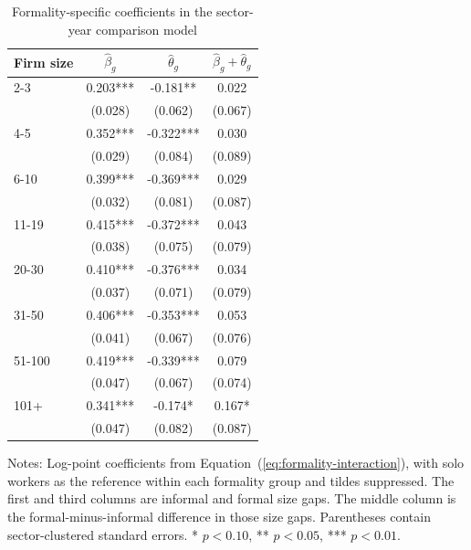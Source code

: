 \begin{table}[htbp]
  \centering
  \caption{Formality-specific coefficients in the sector-year comparison model}
  \label{tab:formality-interaction-coefficients}
  \small
  \begin{tabular}{lccc}
    \toprule
    Firm size & $\hat{\beta}_g$ & $\hat{\theta}_g$ & $\hat{\beta}_g+\hat{\theta}_g$ \\
    \midrule
    2-3 & 0.203*** & -0.181** & 0.022 \\
     & (0.028) & (0.062) & (0.067) \\
    4-5 & 0.352*** & -0.322*** & 0.030 \\
     & (0.029) & (0.084) & (0.089) \\
    6-10 & 0.399*** & -0.369*** & 0.029 \\
     & (0.032) & (0.081) & (0.087) \\
    11-19 & 0.415*** & -0.372*** & 0.043 \\
     & (0.038) & (0.075) & (0.079) \\
    20-30 & 0.410*** & -0.376*** & 0.034 \\
     & (0.037) & (0.071) & (0.079) \\
    31-50 & 0.406*** & -0.353*** & 0.053 \\
     & (0.041) & (0.067) & (0.076) \\
    51-100 & 0.419*** & -0.339*** & 0.079 \\
     & (0.047) & (0.067) & (0.074) \\
    101+ & 0.341*** & -0.174* & 0.167* \\
     & (0.047) & (0.082) & (0.087) \\
    \bottomrule
  \end{tabular}
  \vspace{0.3em}
  \begin{minipage}{0.92\textwidth}
  \footnotesize
  Notes: Log-point coefficients from Equation~(\ref{eq:formality-interaction}), with solo workers as the reference within each formality group and tildes suppressed. The first and third columns are informal and formal size gaps. The middle column is the formal-minus-informal difference in those size gaps. Parentheses contain sector-clustered standard errors. * $p<0.10$, ** $p<0.05$, *** $p<0.01$.
  \end{minipage}
\end{table}
